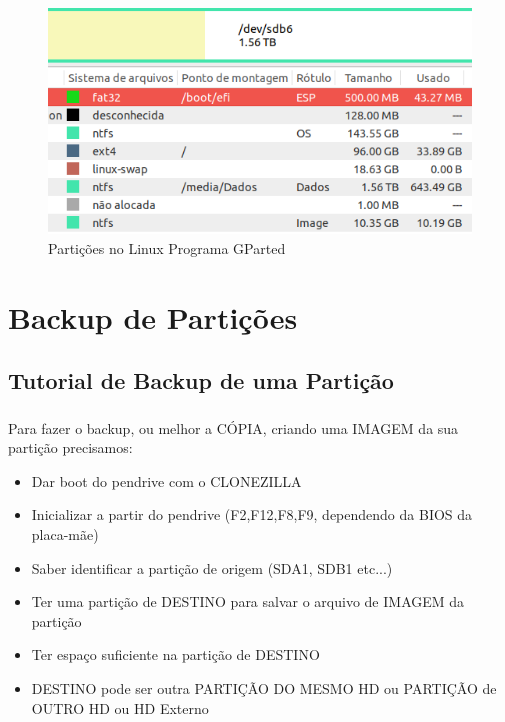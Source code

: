 \documentclass{beamer}
\begin{document}
\begin{frame}[plain,c]
   \frametitle{\insertsection}
    \framesubtitle{\insertsubsection}
    \begin{figure}
        \centering
        \includegraphics[width=1.3\linewidth]{images/particoes2.png}
        \caption{Partições no Linux Programa GParted}
    \end{figure}
\end{frame}


\section{Backup de Partições}
\subsection{Tutorial de Backup de uma Partição}
\begin{frame}
    \frametitle{\insertsection}
    \framesubtitle{\insertsubsection}
     \begin{block}{\insertsubsection}
  	\justifying
 Para fazer o backup, ou melhor a CÓPIA, criando uma IMAGEM da sua partição precisamos:
   
   \begin{itemize}[<+-| alert@+>]
        \item Dar boot do pendrive com o CLONEZILLA 
        \item Inicializar a partir do pendrive (F2,F12,F8,F9, dependendo da BIOS da placa-mãe)
        \item Saber identificar a partição de origem (SDA1, SDB1 etc...) 
        \item Ter uma partição de DESTINO para salvar o arquivo de IMAGEM da partição
        \item Ter espaço suficiente na partição de DESTINO
        \item DESTINO pode ser outra PARTIÇÃO DO MESMO HD ou PARTIÇÃO de OUTRO HD ou HD Externo
    \end{itemize}
\end{block}
\end{frame}
\end{document}
